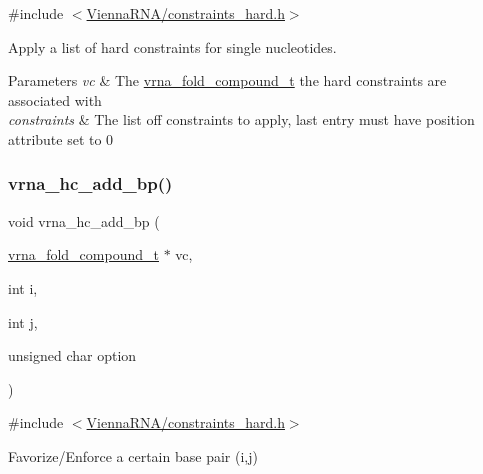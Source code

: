 {\ttfamily \#include $<$\hyperlink{constraints__hard_8h}{Vienna\+R\+N\+A/constraints\+\_\+hard.\+h}$>$}



Apply a list of hard constraints for single nucleotides. 


\begin{DoxyParams}{Parameters}
{\em vc} & The \hyperlink{group__fold__compound_ga1b0cef17fd40466cef5968eaeeff6166}{vrna\+\_\+fold\+\_\+compound\+\_\+t} the hard constraints are associated with \\
\hline
{\em constraints} & The list off constraints to apply, last entry must have position attribute set to 0 \\
\hline
\end{DoxyParams}
\mbox{\label{group__hard__constraints_ga7cba95ebe2ceb5ec9a5768f2232854fd}} 
\subsubsection{\texorpdfstring{vrna\+\_\+hc\+\_\+add\+\_\+bp()}{vrna\_hc\_add\_bp()}}
{\footnotesize\ttfamily void vrna\+\_\+hc\+\_\+add\+\_\+bp (\begin{DoxyParamCaption}\item[{\hyperlink{group__fold__compound_ga1b0cef17fd40466cef5968eaeeff6166}{vrna\+\_\+fold\+\_\+compound\+\_\+t} $\ast$}]{vc,  }\item[{int}]{i,  }\item[{int}]{j,  }\item[{unsigned char}]{option }\end{DoxyParamCaption})}



{\ttfamily \#include $<$\hyperlink{constraints__hard_8h}{Vienna\+R\+N\+A/constraints\+\_\+hard.\+h}$>$}



Favorize/\+Enforce a certain base pair (i,j) 


